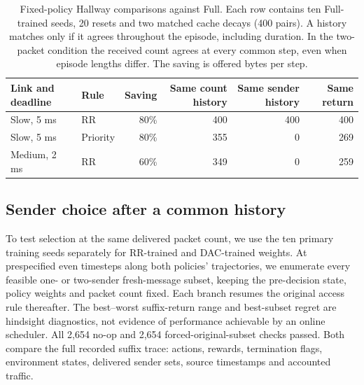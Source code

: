 \documentclass[a4paper,fleqn]{cas-dc}
\begin{document}
\begin{table}[pos=t]\centering\small
\caption{Fixed-policy Hallway comparisons against Full. Each row contains ten Full-trained seeds, 20 resets and two matched cache decays (400 pairs). A history matches only if it agrees throughout the episode, including duration. In the two-packet condition the received count agrees at every common step, even when episode lengths differ. The saving is offered bytes per step.}\label{tab:history_match}
\begin{tabular}{llrrrr}\toprule
Link and deadline & Rule & Saving & Same count history & Same sender history & Same return\\\midrule
Slow, 5 ms & RR & 80\% & 400 & 400 & 400\\
Slow, 5 ms & Priority & 80\% & 355 & 0 & 269\\
Medium, 2 ms & RR & 60\% & 349 & 0 & 259\\
\bottomrule\end{tabular}
\end{table}

\subsection{Sender choice after a common history}
To test selection at the same delivered packet count, we use the ten primary training seeds separately for RR-trained and DAC-trained weights. At prespecified even timesteps along both policies' trajectories, we enumerate every feasible one- or two-sender fresh-message subset, keeping the pre-decision state, policy weights and packet count fixed. Each branch resumes the original access rule thereafter. The best--worst suffix-return range and best-subset regret are hindsight diagnostics, not evidence of performance achievable by an online scheduler. All 2,654 no-op and 2,654 forced-original-subset checks passed. Both compare the full recorded suffix trace: actions, rewards, termination flags, environment states, delivered sender sets, source timestamps and accounted traffic.
\end{document}
